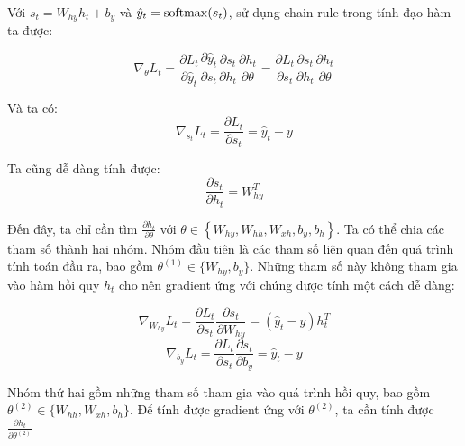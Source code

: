 Với $s_t = W_{hy} h_t + b_y$ và $\hat{y}_t = \mathrm{softmax}(s_t)$, sử dụng chain rule trong tính đạo hàm ta được:
	
\begin{equation} \label{gradientCalculating1}
	\nabla_{\theta} L_t = \frac{\partial L_t}{\partial \hat{y}_t} \frac{\partial \hat{y}_t}{\partial s_t} \frac{\partial s_t}{\partial h_t} \frac{\partial h_t}{\partial \theta}  = \frac{\partial L_t}{\partial s_t} \frac{\partial s_t}{\partial h_t} \frac{\partial h_t}{\partial \theta}
\end{equation}

Và ta có:
\begin{equation} \label{gradientCalculating2}
	\nabla_{s_t}L_t = \frac{\partial L_t}{\partial s_t} = \hat{y}_t - y
\end{equation}

Ta cũng dễ dàng tính được:
\begin{equation} \label{gradientCalculating3}
	\frac{\partial s_t}{\partial h_t} = W_{hy}^T
\end{equation}

Đến đây, ta chỉ cần tìm $\frac{\partial h_t}{\partial \theta}$ với $\theta \in \left\{W_{hy},W_{hh},W_{xh},b_y,b_h \right \}$. Ta có thể chia các tham số thành hai nhóm. Nhóm đầu tiên là các tham số liên quan đến quá trình tính toán đầu ra, bao gồm $\theta^{(1)} \in \{W_{hy}, b_y\}$. Những tham số này không tham gia vào hàm hồi quy $h_t$ cho nên gradient ứng với chúng được tính một cách dễ dàng:

\begin{equation} \label{gradientCalculating4}
	\nabla_{W_{hy}}L_t = \frac{\partial L_t}{\partial s_t} \frac{\partial s_t}{\partial W_{hy}}  =  (\hat{y}_t - y) h_t^T
\end{equation}
\begin{equation} \label{gradientCalculating5}
	\nabla_{b_{y}}L_t = \frac{\partial L_t}{\partial s_t} \frac{\partial s_t}{\partial b_{y}}  =  \hat{y}_t - y
\end{equation}

Nhóm thứ hai gồm những tham số tham gia vào quá trình hồi quy, bao gồm $\theta^{(2)} \in \{W_{hh},W_{xh},b_h \}$. Để tính được gradient ứng với $\theta^{(2)}$, ta cần tính được $\frac{\partial h_t}{\partial \theta^{(2)} }$

